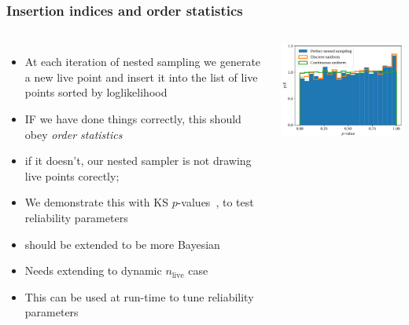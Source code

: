 \documentclass[aspectratio=169,handout]{beamer}
\begin{document}
\begin{frame}
    \frametitle{Insertion indices and order statistics}
    \begin{columns}
    \begin{itemize}
        \item At each iteration of nested sampling we generate a new live point and insert it into the list of live points sorted by loglikelihood
        \item IF we have done things correctly, this should obey \emph{order statistics}
        \item if it doesn't, our nested sampler is not drawing live points corectly;
        \item We demonstrate this with KS $p$-values~, to test reliability parameters
        \item should be extended to be more Bayesian
        \item Needs extending to dynamic $n_\mathrm{live}$ case
        \item This can be used at run-time to tune reliability parameters 
    \end{itemize}
        \includegraphics[width=\textwidth]{figures/indices}
    \end{columns}
\end{frame}
\end{document}
